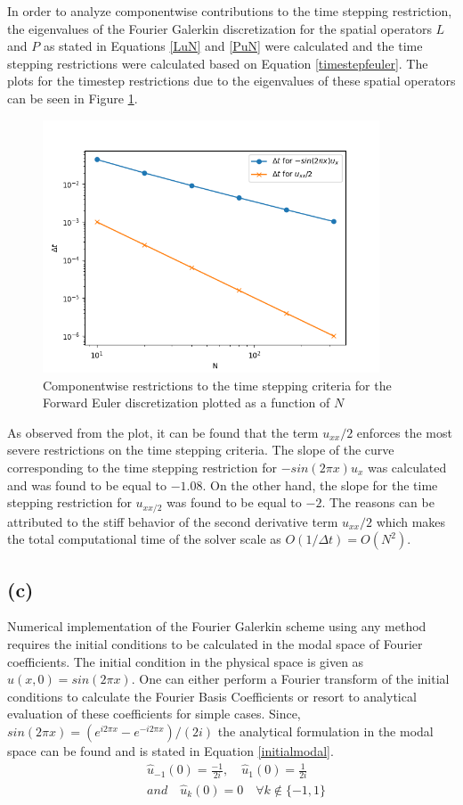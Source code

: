 \documentclass[12pt,dvipsnames]{article}
\begin{document}
In order to analyze componentwise contributions to the time stepping restriction, the eigenvalues of the Fourier Galerkin discretization for the spatial operators $L$ and $P$ as stated in Equations \ref{LuN} and \ref{PuN} were calculated and the time stepping restrictions were calculated based on Equation \ref{timestepfeuler}. The plots for the timestep restrictions due to the eigenvalues of these spatial operators can be seen in Figure \ref{fig:componentwise_restriction}.
\begin{figure}
    \centering
    \includegraphics[width=10cm]{dtComponentwise_Q1.png}
    \caption{Componentwise restrictions to the time stepping criteria for the Forward Euler discretization plotted as a function of $N$}
    \label{fig:componentwise_restriction}
\end{figure}
As observed from the plot, it can be found that the term $u_{xx}/2$ enforces the most severe restrictions on the time stepping criteria. The slope of the curve corresponding to the time stepping restriction for $-sin(2 \pi x)u_x$ was calculated and was found to be equal to $-1.08$. On the other hand, the slope for the time stepping restriction for $u_{xx/2}$ was found to be equal to $-2$. The reasons can be attributed to the stiff behavior of the second derivative term $u_{xx}/2$ which makes the total computational time of the solver scale as $O(1/\Delta t) = O(N^2)$.  
\subsection{(c)}
Numerical implementation of the Fourier Galerkin scheme using any method requires the initial conditions to be calculated in the modal space of Fourier coefficients. The initial condition in the physical space is given as $u(x, 0) = sin(2 \pi x)$. One can either perform a Fourier transform of the initial conditions to calculate the Fourier Basis Coefficients or resort to analytical evaluation of these coefficients for simple cases. Since, $sin(2 \pi x) = (e^{i 2 \pi x} - e^{-i 2 \pi x})/(2i)$ the analytical formulation in the modal space can be found and is stated in Equation \ref{initialmodal}.
\begin{equation}
    \begin{aligned}
        & \hat{u}_{-1}(0) = \frac{-1}{2i}, \quad \hat{u}_{1}(0) = \frac{1}{2i} \\
        & and \quad \hat{u}_k(0) = 0 \quad \forall k \notin \{ -1, 1 \}
    \end{aligned}
    \label{initialmodal}
\end{equation}
\end{document}
